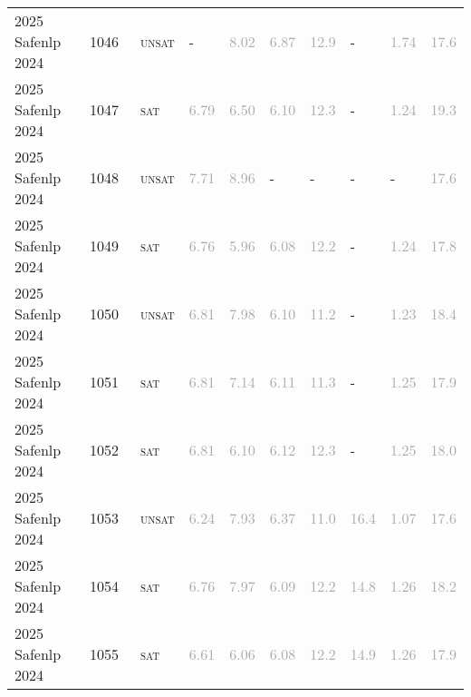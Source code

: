 \begin{center}
{\begin{longtable}{@{}llllllllll@{}}
2025 Safenlp 2024 & 1046 & ~\textsc{unsat} & - & \textcolor{darkgray}{8.02} & \textcolor{darkgray}{6.87} & \textcolor{darkgray}{12.9} & - & \textcolor{darkgray}{1.74} & \textcolor{darkgray}{17.6} \\
2025 Safenlp 2024 & 1047 & ~\textsc{sat} & \textcolor{darkgray}{6.79} & \textcolor{darkgray}{6.50} & \textcolor{darkgray}{6.10} & \textcolor{darkgray}{12.3} & - & \textcolor{darkgray}{1.24} & \textcolor{darkgray}{19.3} \\
2025 Safenlp 2024 & 1048 & ~\textsc{unsat} & \textcolor{darkgray}{7.71} & \textcolor{darkgray}{8.96} & - & - & - & - & \textcolor{darkgray}{17.6} \\
2025 Safenlp 2024 & 1049 & ~\textsc{sat} & \textcolor{darkgray}{6.76} & \textcolor{darkgray}{5.96} & \textcolor{darkgray}{6.08} & \textcolor{darkgray}{12.2} & - & \textcolor{darkgray}{1.24} & \textcolor{darkgray}{17.8} \\
2025 Safenlp 2024 & 1050 & ~\textsc{unsat} & \textcolor{darkgray}{6.81} & \textcolor{darkgray}{7.98} & \textcolor{darkgray}{6.10} & \textcolor{darkgray}{11.2} & - & \textcolor{darkgray}{1.23} & \textcolor{darkgray}{18.4} \\
2025 Safenlp 2024 & 1051 & ~\textsc{sat} & \textcolor{darkgray}{6.81} & \textcolor{darkgray}{7.14} & \textcolor{darkgray}{6.11} & \textcolor{darkgray}{11.3} & - & \textcolor{darkgray}{1.25} & \textcolor{darkgray}{17.9} \\
2025 Safenlp 2024 & 1052 & ~\textsc{sat} & \textcolor{darkgray}{6.81} & \textcolor{darkgray}{6.10} & \textcolor{darkgray}{6.12} & \textcolor{darkgray}{12.3} & - & \textcolor{darkgray}{1.25} & \textcolor{darkgray}{18.0} \\
2025 Safenlp 2024 & 1053 & ~\textsc{unsat} & \textcolor{darkgray}{6.24} & \textcolor{darkgray}{7.93} & \textcolor{darkgray}{6.37} & \textcolor{darkgray}{11.0} & \textcolor{darkgray}{16.4} & \textcolor{darkgray}{1.07} & \textcolor{darkgray}{17.6} \\
2025 Safenlp 2024 & 1054 & ~\textsc{sat} & \textcolor{darkgray}{6.76} & \textcolor{darkgray}{7.97} & \textcolor{darkgray}{6.09} & \textcolor{darkgray}{12.2} & \textcolor{darkgray}{14.8} & \textcolor{darkgray}{1.26} & \textcolor{darkgray}{18.2} \\
2025 Safenlp 2024 & 1055 & ~\textsc{sat} & \textcolor{darkgray}{6.61} & \textcolor{darkgray}{6.06} & \textcolor{darkgray}{6.08} & \textcolor{darkgray}{12.2} & \textcolor{darkgray}{14.9} & \textcolor{darkgray}{1.26} & \textcolor{darkgray}{17.9} \\

\end{longtable}}
\end{center}
